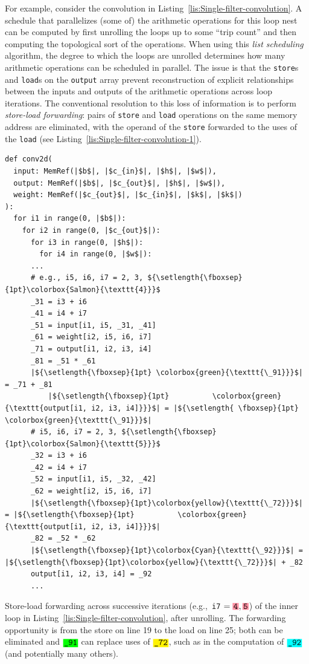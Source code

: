 \documentclass[10pt]{sig-alternate}
\begin{document}
For example, consider the convolution
in Listing~\ref{lis:Single-filter-convolution}.
A schedule that parallelizes (some of) the arithmetic operations
for this loop nest can be computed by first unrolling the loops up
to some ``trip count'' and then computing the topological sort of
the operations. When using this \emph{list
scheduling} algorithm, the degree to which the loops are unrolled determines
how many arithmetic operations can be scheduled in parallel. The issue
is that the \texttt{store}s and \texttt{load}s on the \texttt{output}
array prevent reconstruction of explicit relationships between the
inputs and outputs of the arithmetic operations across loop iterations.
The conventional resolution to this loss of information is to perform
\emph{store-load forwarding}: pairs of \texttt{store} and \texttt{load}
operations on the same memory address are eliminated, with the operand
of the \texttt{store} forwarded to the uses of the \texttt{load} (see
Listing~\ref{lis:Single-filter-convolution-1}).
\begin{listing}
\begin{verbatim}
def conv2d(
  input: MemRef(|$b$|, |$c_{in}$|, |$h$|, |$w$|),
  output: MemRef(|$b$|, |$c_{out}$|, |$h$|, |$w$|),
  weight: MemRef(|$c_{out}$|, |$c_{in}$|, |$k$|, |$k$|)
):
  for i1 in range(0, |$b$|):
    for i2 in range(0, |$c_{out}$|):
      for i3 in range(0, |$h$|):
        for i4 in range(0, |$w$|):
	  ...
	  # e.g., i5, i6, i7 = 2, 3, ${\setlength{\fboxsep}{1pt}\colorbox{Salmon}{\texttt{4}}}$
	  _31 = i3 + i6
	  _41 = i4 + i7
	  _51 = input[i1, i5, _31, _41]
	  _61 = weight[i2, i5, i6, i7]
	  _71 = output[i1, i2, i3, i4]
	  _81 = _51 * _61
	  |${\setlength{\fboxsep}{1pt} \colorbox{green}{\texttt{\_91}}}$| = _71 + _81
          |${\setlength{\fboxsep}{1pt}          \colorbox{green}{\texttt{output[i1, i2, i3, i4]}}}$| = |${\setlength{ \fboxsep}{1pt} \colorbox{green}{\texttt{\_91}}}$|
	  # i5, i6, i7 = 2, 3, ${\setlength{\fboxsep}{1pt}\colorbox{Salmon}{\texttt{5}}}$
	  _32 = i3 + i6
	  _42 = i4 + i7
	  _52 = input[i1, i5, _32, _42]
	  _62 = weight[i2, i5, i6, i7]
	  |${\setlength{\fboxsep}{1pt}\colorbox{yellow}{\texttt{\_72}}}$| = |${\setlength{\fboxsep}{1pt}          \colorbox{green}{\texttt{output[i1, i2, i3, i4]}}}$|
	  _82 = _52 * _62
	  |${\setlength{\fboxsep}{1pt}\colorbox{Cyan}{\texttt{\_92}}}$| = |${\setlength{\fboxsep}{1pt}\colorbox{yellow}{\texttt{\_72}}}$| + _82
	  output[i1, i2, i3, i4] = _92
	  ...
\end{verbatim}
\caption{Store-load forwarding across successive iterations (e.g.,\texttt{
i7} $={\setlength{\fboxsep}{1pt}\colorbox{Salmon}{\texttt{4}}}, {\setlength{\fboxsep}{1pt}\colorbox{Salmon}{\texttt{5}}}$)
of the inner loop in Listing~\ref{lis:Single-filter-convolution},
after unrolling. The forwarding opportunity is from the store on line
19 to the load on line 25; both can be eliminated and ${\setlength{\fboxsep}{1pt}\colorbox{green}{\texttt{\_91}}}$
can replace uses of ${\setlength{\fboxsep}{1pt}\colorbox{yellow}{\texttt{\_72}}}$,
such as in the computation of \texttt{${\setlength{\fboxsep}{1pt}\colorbox{Cyan}{\texttt{\_92}}}$}
(and potentially many others).\label{lis:Single-filter-convolution-1}}
\end{listing}
\end{document}
